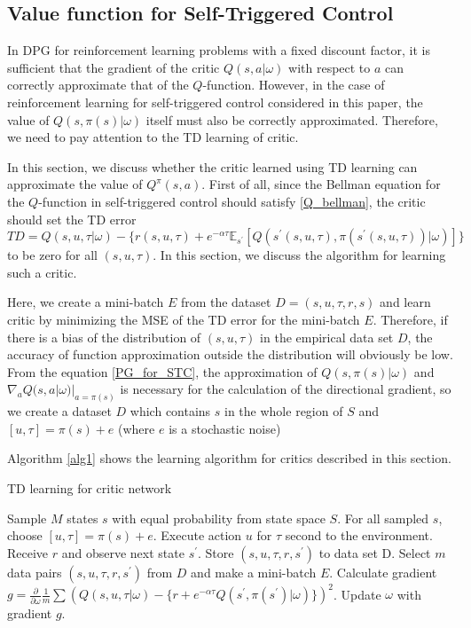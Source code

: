 \documentclass[english, dvipdfmx]{ampmt}             %
\newcommand{\expect}{\mathbb{E}}
\newcommand{\pdif}[2]{\frac{\partial#1}{\partial#2}}
\begin{document}
\subsection{Value function for Self-Triggered Control}
In DPG for reinforcement learning problems with a fixed discount factor, it is sufficient that the gradient of the critic $Q(s,a|\omega)$ with respect to $a$ can correctly approximate that of the $Q$-function. However, in the case of reinforcement learning for self-triggered control considered in this paper, the value of $Q(s,\pi(s)|\omega)$ itself must also be correctly approximated. Therefore, we need to pay attention to the TD learning of critic.\par
In this section, we discuss whether the critic learned using TD learning can approximate the value of $Q^{\pi}(s,a)$. First of all, since the Bellman equation for the $Q$-function in self-triggered control should satisfy \eqref{Q_bellman}, the critic should set the TD error
\begin{equation}
	TD = Q(s,u,\tau|\omega) - \{r(s,u,\tau) + e^{-\alpha\tau}\expect_{s^{\prime}}[Q(s^{\prime}(s,u,\tau), \pi(s^{\prime}(s,u,\tau))|\omega)]\}
\end{equation}
 to be zero for all $(s,u,\tau)$. In this section, we discuss the algorithm for learning such a critic.\par
Here, we create a mini-batch $E$ from the dataset $D={(s,u,\tau,r,s)}$ and learn critic by minimizing the MSE of the TD error for the mini-batch $E$. Therefore, if there is a bias of the distribution of $(s,u,\tau)$ in the empirical data set $D$, the accuracy of function approximation outside the distribution will obviously be low. From the equation \eqref{PG_for_STC}, the approximation of $Q(s, \pi(s)|\omega)$ and $\nabla_aQ(s,a|\omega)|_{a=\pi(s)}$ is necessary for the calculation of the directional gradient, so we create a dataset $D$ which contains $s$ in the whole region of $S$ and $[u,\tau] = \pi(s) + e $ (where $e$ is a stochastic noise)\par
Algorithm \ref{alg1} shows the learning algorithm for critics described in this section.
\begin{algorithm}                      
\caption{TD learning for critic network}         
\label{alg1}                          
\begin{algorithmic}                  
    \STATE Sample $M$ states $s$ with equal probability from state space $S$.
    	\STATE For all sampled $s$, choose $[u, \tau]=\pi(s) + e$.
	\STATE Execute action $u$ for $\tau$ second to the environment.
	\STATE Receive $r$ and observe next state $s^{\prime}$.
	\STATE Store $(s, u, \tau, r, s^{\prime})$ to data set D.
    \ENDFOR
    	\STATE Select $m$ data pairs $(s, u, \tau, r, s^{\prime})$ from $D$ and make a mini-batch $E$.
	\STATE Calculate gradient $g = \pdif{}{\omega} \frac{1}{m}\sum\left(Q(s,u,\tau|\omega) - \{r + e^{-\alpha\tau}Q(s^{\prime}, \pi(s^{\prime})|\omega)\}\right)^2$.
	\STATE Update $\omega$ with gradient $g$.
    \ENDFOR
    \end{algorithmic}
\end{algorithm}
\end{document}
